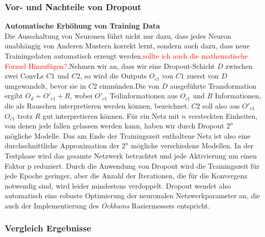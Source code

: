 \documentclass[12pt,a4paper]{scrartcl}
\numberwithin{equation}{section}
\begin{document}
\subsubsection{Vor- und Nachteile von Dropout}
\textbf{Automatische Erhöhung von Training Data }\\
Die Ausschaltung von Neuronen führt nicht nur dazu, dass jedes Neuron unabhängig von Anderen Mustern korrekt lernt, sondern auch dazu, dass neue Trainingsdaten automatisch erzeugt werden.\textcolor{red}{sollte ich auch die mathematische Formel Hinzufügen?}.Nehmen wir an, dass wir eine Dropout-Schicht $ D $  zwischen zwei \acsp{ConvL}  $ C1 $ und $ C2 $, so wird die Outputs $ O_{c1} $ von $ C1 $ zuerst von $ D $ umgewandelt, bevor sie in $ C2 $ einmünden.Die von $ D $ ausgeführte Transformation ergibt $ O_d = O'_{c1} +R $, wobei $ O'_{c1} $ Teilinformationen aus $ O_{c1} $  und $ R $  Informationen, die als Rauschen interpretieren werden können, bezeichnet. $ C2 $ soll also aus       $ O'_{c1} $ $ O_{c1} $ trotz $ R $ gut interpretieren können.
Für ein Netz mit $ n $ versteckten Einheiten, von denen jede fallen gelassen werden kann, haben wir durch Dropout $ 2^n $ mögliche Modelle. Das am Ende der Trainingszeit enthaltene Netz ist also eine durchschnittliche Approximation der $ 2^n $ mögliche verschiedene Modellen. In der Testphase wird das gesamte Netzwerk betrachtet und jede Aktivierung um einen Faktor p reduziert.
Durch die Anwendung von Dropout wird die Trainingszeit für jede Epoche geringer, aber die Anzahl der Iterationen, die für die Konvergenz notwendig sind, wird leider mindestens verdoppelt.
Dropout wendet also automatisch eine robuste Optimierung der neuronalen Netzwerkparameter an, die auch der Implementierung des \textit{Ockhams} Rasiermessers entspricht.

\subsubsection{Vergleich Ergebnisse}
\end{document}

